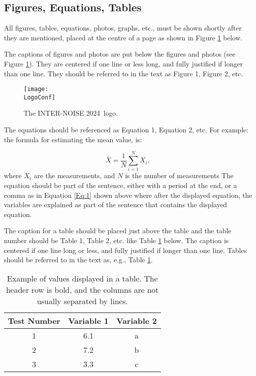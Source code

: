\documentclass[a4paper,12pt]{article}
\newcommand{\YearConf}{2024}
\newcommand{\LogoConf}{logo_IN24.jpg}
\begin{document}
\subsection{Figures, Equations, Tables}
\noindent
All figures, tables, equations, photos, graphs, etc., must be shown shortly after they are mentioned, placed at the centre of a page as shown in Figure \ref{fig:1} below.

The captions of figures and photos are put below the figures and photos (see Figure \ref{fig:1}).  They are centered if one line or less long, and fully justified if longer than one line.  They should be referred to in the text as Figure 1, Figure 2, etc. 
\begin{figure}[h!]
\begin{center}
  \texttt{[image: \\LogoConf]}
  \end{center}
  \caption{The INTER-NOISE \YearConf   ~logo.}
  \label{fig:1}
\end{figure}

The equations should be referenced as Equation 1, Equation 2, etc. For example: the formula for estimating the mean value, is:

\begin{equation}
\bar{X} = \frac{1}{N} \sum_{i=1}^{N} X_i ,
\label{Eq:1}
\end{equation}
\noindent
where $X_i$ are the measurements, and $N$ is the number of measurements  The equation should be part of the sentence, either with a period at the end, or a comma as in Equation \ref{Eq:1} shown above where after the displayed equation, the variables are explained as part of the sentence that contains the displayed equation. 

The caption for a table should be placed just above the table and the table number should be Table 1, Table 2,  etc. like Table \ref{Tab:1} below.  The caption is centered if one line long or less, and fully justified if longer than one line.  Tables should be referred to in the text as, e.g., Table \ref{Tab:1}.

\begin{table}[h!]

\caption{Example of values displayed in a table. The header row is bold, and the columns are not usually separated by lines.}
\label{Tab:1}

\begin{center}
\begin{tabular}{c c c } 
 \hline
 \textbf{Test Number} &  \textbf{Variable 1}& \textbf{Variable 2}  \\ [0.5ex] 
 \hline
 1 & 6.1 & a \\ 
 \hline
 2 & 7.2 & b  \\
 \hline
 3 & 3.3 & c \\ [1ex] 
 \hline
\end{tabular}
\end{center}

\end{table}
\end{document}
